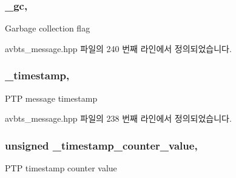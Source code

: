 \subsubsection[{\texorpdfstring{\+\_\+gc}{_gc}}]{ \+\_\+gc\hspace{0.3cm}{\ttfamily [protected]}, {\ttfamily [inherited]}}\hypertarget{class_p_t_p_message_common_a1b15d1687680708819ead19f82a970a9}{}\label{class_p_t_p_message_common_a1b15d1687680708819ead19f82a970a9}
Garbage collection flag 

avbts\+\_\+message.\+hpp 파일의 240 번째 라인에서 정의되었습니다.

\subsubsection[{\texorpdfstring{\+\_\+timestamp}{_timestamp}}]{ \+\_\+timestamp\hspace{0.3cm}{\ttfamily [protected]}, {\ttfamily [inherited]}}\hypertarget{class_p_t_p_message_common_aeafd115d5626f0602ab067a502d83d3e}{}\label{class_p_t_p_message_common_aeafd115d5626f0602ab067a502d83d3e}
P\+TP message timestamp 

avbts\+\_\+message.\+hpp 파일의 238 번째 라인에서 정의되었습니다.

\subsubsection[{\texorpdfstring{\+\_\+timestamp\+\_\+counter\+\_\+value}{_timestamp_counter_value}}]{\setlength{\rightskip}{0pt plus 5cm}unsigned \+\_\+timestamp\+\_\+counter\+\_\+value\hspace{0.3cm}{\ttfamily [protected]}, {\ttfamily [inherited]}}\hypertarget{class_p_t_p_message_common_a9d90ca571f84fe3633c7539e24783190}{}\label{class_p_t_p_message_common_a9d90ca571f84fe3633c7539e24783190}
P\+TP timestamp counter value 

